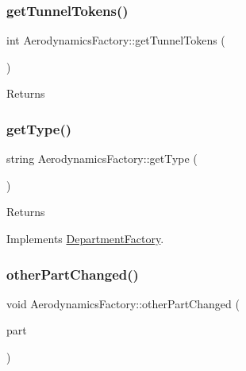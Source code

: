 \subsubsection{\texorpdfstring{get\+Tunnel\+Tokens()}{getTunnelTokens()}}
{\footnotesize\ttfamily int Aerodynamics\+Factory\+::get\+Tunnel\+Tokens (\begin{DoxyParamCaption}{ }\end{DoxyParamCaption})}

\begin{DoxyReturn}{Returns}

\end{DoxyReturn}
\mbox{\label{classAerodynamicsFactory_a3b0af6c00d4a8549164b3d5ec9a1f256}} 
\subsubsection{\texorpdfstring{get\+Type()}{getType()}}
{\footnotesize\ttfamily string Aerodynamics\+Factory\+::get\+Type (\begin{DoxyParamCaption}{ }\end{DoxyParamCaption})\hspace{0.3cm}{\ttfamily [virtual]}}

\begin{DoxyReturn}{Returns}

\end{DoxyReturn}


Implements \hyperlink{classDepartmentFactory_a5aac775b89c4c390ad885e1de8947b0d}{Department\+Factory}.

\mbox{\label{classAerodynamicsFactory_a873e60729f4e8a74608fbf29322cf2f6}} 
\subsubsection{\texorpdfstring{other\+Part\+Changed()}{otherPartChanged()}}
{\footnotesize\ttfamily void Aerodynamics\+Factory\+::other\+Part\+Changed (\begin{DoxyParamCaption}\item[{\hyperlink{classDepartmentOutput}{Department\+Output} $\ast$}]{part }\end{DoxyParamCaption})\hspace{0.3cm}{\ttfamily [virtual]}}


